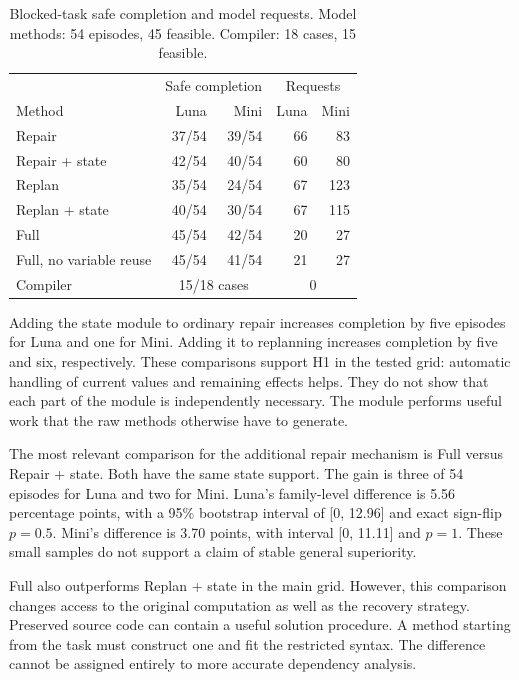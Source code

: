\documentclass[conference]{IEEEtran}
\newcommand{\smalltable}{\fontsize{8}{9.5}\selectfont}
\begin{document}
\begin{table}[t]
\caption{Blocked-task safe completion and model requests. Model methods: 54 episodes, 45 feasible. Compiler: 18 cases, 15 feasible.}
\label{tab:main}
\centering\smalltable
\begin{tabular}{lrrrr}
\toprule
&\multicolumn{2}{c}{Safe completion}&\multicolumn{2}{c}{Requests}\\
Method&Luna&Mini&Luna&Mini\\
\midrule
Repair&37/54&39/54&66&83\\
Repair + state&42/54&40/54&60&80\\
Replan&35/54&24/54&67&123\\
Replan + state&40/54&30/54&67&115\\
Full&45/54&42/54&20&27\\
Full, no variable reuse&45/54&41/54&21&27\\
\midrule
Compiler&\multicolumn{2}{c}{15/18 cases}&\multicolumn{2}{c}{0}\\
\bottomrule
\end{tabular}
\end{table}

Adding the state module to ordinary repair increases completion by five episodes for Luna and one for Mini. Adding it to replanning increases completion by five and six, respectively. These comparisons support H1 in the tested grid: automatic handling of current values and remaining effects helps. They do not show that each part of the module is independently necessary. The module performs useful work that the raw methods otherwise have to generate.

The most relevant comparison for the additional repair mechanism is Full versus Repair + state. Both have the same state support. The gain is three of 54 episodes for Luna and two for Mini. Luna's family-level difference is 5.56 percentage points, with a 95\% bootstrap interval of [0, 12.96] and exact sign-flip $p=0.5$. Mini's difference is 3.70 points, with interval [0, 11.11] and $p=1$. These small samples do not support a claim of stable general superiority.

Full also outperforms Replan + state in the main grid. However, this comparison changes access to the original computation as well as the recovery strategy. Preserved source code can contain a useful solution procedure. A method starting from the task must construct one and fit the restricted syntax. The difference cannot be assigned entirely to more accurate dependency analysis.
\end{document}
